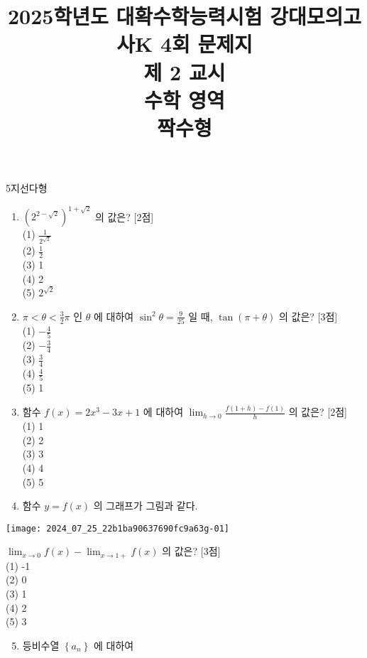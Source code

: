\documentclass[10pt]{article}
\title{2025학년도 대확수학능력시험 강대모의고사K 4회 문제지 \\
 제 2 교시 \\
 수학 영역 \\
 짝수형 }
\author{}
\date{}
\begin{document}
\maketitle
5지선다형

\begin{enumerate}
  \item $\left(2^{2-\sqrt{2}}\right)^{1+\sqrt{2}}$ 의 값은? [2점]\\
(1) $\frac{1}{2^{\sqrt{2}}}$\\
(2) $\frac{1}{2}$\\
(3) 1\\
(4) 2\\
(5) $2^{\sqrt{2}}$

  \item $\pi<\theta<\frac{3}{2} \pi$ 인 $\theta$ 에 대하여 $\sin ^{2} \theta=\frac{9}{25}$ 일 때, $\tan (\pi+\theta)$ 의 값은? [3점]\\
(1) $-\frac{4}{5}$\\
(2) $-\frac{3}{4}$\\
(3) $\frac{3}{4}$\\
(4) $\frac{4}{5}$\\
(5) 1

  \item 함수 $f(x)=2 x^{3}-3 x+1$ 에 대하여 $\lim _{h \rightarrow 0} \frac{f(1+h)-f(1)}{h}$ 의 값은? [2점]\\
(1) 1\\
(2) 2\\
(3) 3\\
(4) 4\\
(5) 5

  \item 함수 $y=f(x)$ 의 그래프가 그림과 같다.

\end{enumerate}

\begin{center}
\texttt{[image: 2024\_07\_25\_22b1ba90637690fc9a63g-01]}
\end{center}

$\lim _{x \rightarrow 0} f(x)-\lim _{x \rightarrow 1+} f(x)$ 의 값은? [3점]\\
(1) -1\\
(2) 0\\
(3) 1\\
(4) 2\\
(5) 3

\begin{enumerate}
  \setcounter{enumi}{4}
  \item 등비수열 $\left\{a_{n}\right\}$ 에 대하여
\end{enumerate}
\end{document}
